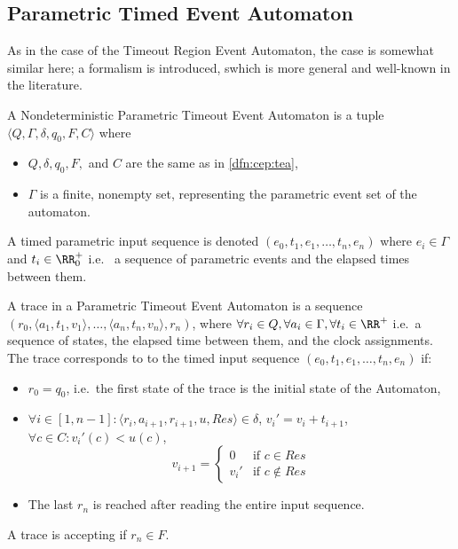 		\subsection{Parametric Timed Event Automaton}
		
		As in the case of the Timeout Region Event Automaton, the case is somewhat similar here; a formalism is introduced, swhich is more general and well-known in the literature. 
		
		
		\begin{dfn}
			\label{dfn:cep:ptea}
			A Nondeterministic Parametric Timeout Event Automaton is a tuple $\langle Q,\Gamma,\delta,q_0, F, C \rangle$ where
			\begin{itemize}
				\item $Q, \delta, q_0, F,$ and $C$ are the same as in \cref{dfn:cep:tea},	
				\item $\Gamma$ is a finite, nonempty set, representing the parametric event set of the automaton.
			\end{itemize}
		\end{dfn}
		
		\begin{dfn}
			\label{dfn:cep:ptea:inputseq}
			A timed parametric input sequence is denoted $(e_0, t_1, e_1, \dots, t_n, e_n)$ where $e_i \in \Gamma$ and $t_i \in \RR^+_0$ i.e.~ a sequence of parametric events and the elapsed times between them.
		\end{dfn}
		
		\begin{dfn}
			\label{dfn:cep:ptea:trace}

			A trace in a Parametric Timeout Event Automaton is a sequence
			$(r_0, \langle a_1, t_1, v_1\rangle, \dots, \langle a_n, t_n, v_n \rangle, r_n)$, where $\forall r_i \in Q, \forall a_i \in \Gamma, \forall t_i \in \RR^+$ i.e.~a sequence of states, the elapsed time between them, and the clock assignments. The trace corresponds to to the timed input sequence $(e_0, t_1, e_1, \dots, t_n, e_n)$ if:
			\begin{itemize}
				\item $r_0 = q_0$, i.e.~the first state of the trace is the initial state of the Automaton,
				\item $\forall i \in [1,n - 1] \colon \langle r_i, a_{i+1}, r_{i+1}, u, \mathit{Res} \rangle \in \delta$, 
				${v_i}' = v_i + t_{i+1}$, $\forall c \in C \colon {v_i}'(c) < u(c)$,\\
				$$v_{i+1} = \begin{cases}
				0      & \text{if\ } c \in    \mathit{Res} \\
				{v_i}' & \text{if\ } c \notin \mathit{Res}
				\end{cases}$$
				\item The last $r_n$ is reached after reading the entire input sequence.	
			\end{itemize}
			A trace is accepting if $r_n \in F$.
		\end{dfn}
		
